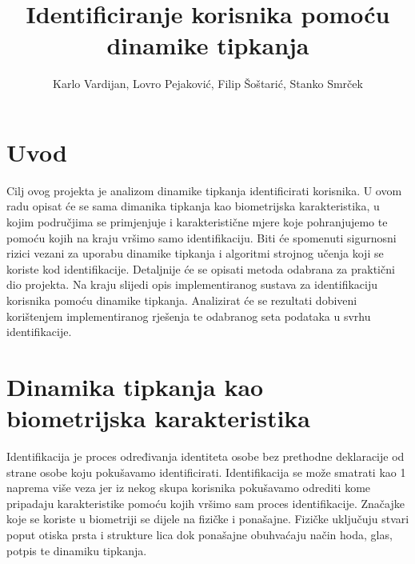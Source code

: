 \documentclass[]{foi}
\title{Identificiranje korisnika pomoću dinamike tipkanja}
\author{Karlo Vardijan, Lovro Pejaković, Filip Šoštarić, Stanko Smrček}
\begin{document}
\maketitle

\tableofcontents

\makeatletter {} \makeatother
\pagestyle{plain}



\chapter{Uvod}

Cilj ovog projekta je analizom dinamike tipkanja identificirati korisnika. U ovom radu opisat će se sama dimanika tipkanja kao biometrijska karakteristika, u kojim područjima se primjenjuje i karakteristične mjere koje pohranjujemo te pomoću kojih na kraju vršimo samo identifikaciju. Biti će spomenuti sigurnosni rizici vezani za uporabu dinamike tipkanja i algoritmi strojnog učenja koji se koriste kod identifikacije. Detaljnije će se opisati metoda odabrana za praktični dio projekta. Na kraju slijedi opis implementiranog sustava za identifikaciju korisnika pomoću dinamike tipkanja. Analizirat će se rezultati dobiveni korištenjem implementiranog rješenja te odabranog seta podataka u svrhu identifikacije.

\chapter{Dinamika tipkanja kao biometrijska karakteristika}
Identifikacija je proces određivanja identiteta osobe bez prethodne deklaracije od strane osobe koju pokušavamo identificirati.\cite{Kasprowski2022} Identifikacija se može smatrati kao 1 naprema više veza jer iz nekog skupa korisnika pokušavamo odrediti kome pripadaju karakteristike pomoću kojih vršimo sam proces identifikacije. Značajke koje se koriste u biometriji se dijele na fizičke i ponašajne. Fizičke uključuju stvari poput otiska prsta i strukture lica dok ponašajne obuhvaćaju način hoda, glas, potpis te dinamiku tipkanja.\cite{Kasprowski2022}
\end{document}
